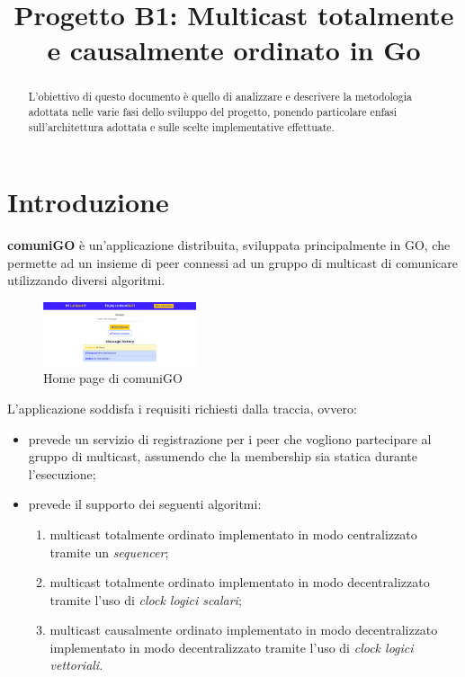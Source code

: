 \documentclass[conference]{IEEEtran}
\begin{document}
\title{Progetto B1: Multicast totalmente e causalmente ordinato in Go}

\author{
}


\maketitle

\begin{abstract}
L'obiettivo di questo documento è quello di analizzare e descrivere la metodologia adottata nelle varie fasi dello sviluppo del progetto, ponendo particolare enfasi sull'architettura adottata e sulle scelte implementative effettuate. 
\end{abstract}

\section{Introduzione}
\textbf{comuniGO} è un'applicazione distribuita, sviluppata principalmente in GO, che permette ad un insieme di peer connessi ad un gruppo di multicast di comunicare utilizzando diversi algoritmi.

\begin{figure}[htbp]
\centerline{\includegraphics[width=0.4\textwidth]{figs/home.png}}
\caption{Home page di comuniGO}
\label{fig:home}
\end{figure}

L'applicazione soddisfa i requisiti richiesti dalla traccia, ovvero:
\begin{itemize}
\item prevede un servizio di registrazione per i peer che vogliono partecipare al gruppo di multicast, assumendo che la membership sia statica durante l'esecuzione;

\item prevede il supporto dei seguenti algoritmi:
\begin{enumerate}
\item multicast totalmente ordinato implementato in modo centralizzato tramite un \textsl{sequencer};

\item multicast totalmente ordinato implementato in modo decentralizzato tramite l'uso di \textsl{clock logici
scalari};

\item multicast causalmente ordinato implementato in modo decentralizzato implementato in modo decentralizzato tramite l'uso di \textsl{clock
logici vettoriali}.
\end{enumerate}
\end{itemize}
\end{document}
